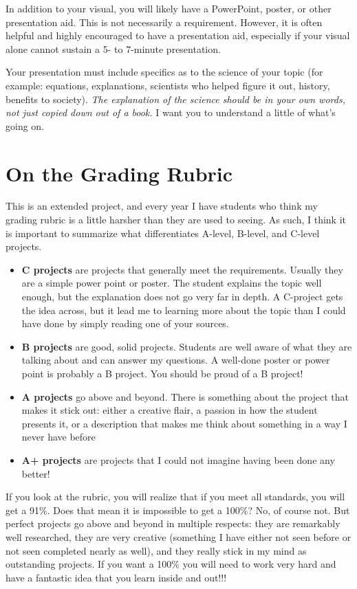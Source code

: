 \documentclass[11pt]{exam}
\begin{document}
In addition to your visual, you will likely have a PowerPoint, poster, or other presentation aid.  This is not necessarily a requirement.  However, it is often helpful and highly encouraged to have a presentation aid, especially if your visual alone cannot sustain a 5- to 7-minute presentation.  

Your presentation must include specifics as to the science of your topic (for example: equations, explanations, scientists who helped figure it out, history, benefits to society).  \emph{The explanation of the science should be in your own words, not just copied down out of a book.}  I want you to understand a little of what's going on.  

\pagebreak

\section*{On the Grading Rubric}
This is an extended project, and every year I have students who think my grading rubric is a little harsher than they are used to seeing.  As such, I think it is important to summarize what differentiates A-level, B-level, and C-level projects.

  \begin{itemize}
    \item {\bf C projects} are projects that generally meet the requirements.  Usually they are a simple power point or poster.  The student explains the topic well enough, but the explanation does not go very far in depth.  A C-project gets the idea across, but it lead me to learning more about the topic than I could have done by simply reading one of your sources.
    \item {\bf B projects} are good, solid projects.  Students are well aware of what they are talking about and can answer my questions.  A well-done poster or power point is probably a B project.  You should be proud of a B project!
    \item {\bf A projects} go above and beyond.  There is something about the project that makes it stick out: either a creative flair, a passion in how the student presents it, or a description that makes me think about something in a way I never have before
    \item {\bf A+ projects} are projects that I could not imagine having been done any better!
  \end{itemize}

If you look at the rubric, you will realize that if you meet all standards, you will get a 91\%.  Does that mean it is impossible to get a 100\%?  No, of course not.  But perfect projects go above and beyond in multiple respects: they are remarkably well researched, they are very creative (something I have either not seen before or not seen completed nearly as well), and they really stick in my mind as outstanding projects.  If you want a 100\% you will need to work very hard and have a fantastic idea that you learn inside and out!!!
\end{document}
